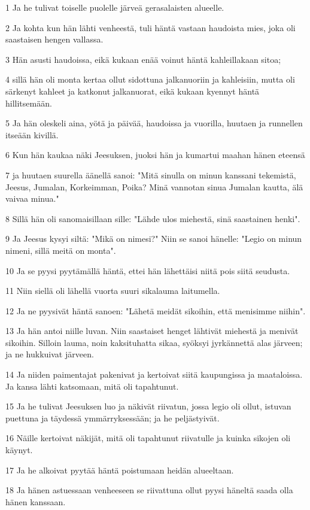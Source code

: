 \par 1 Ja he tulivat toiselle puolelle järveä gerasalaisten alueelle.
\par 2 Ja kohta kun hän lähti venheestä, tuli häntä vastaan haudoista mies, joka oli saastaisen hengen vallassa.
\par 3 Hän asusti haudoissa, eikä kukaan enää voinut häntä kahleillakaan sitoa;
\par 4 sillä hän oli monta kertaa ollut sidottuna jalkanuoriin ja kahleisiin, mutta oli särkenyt kahleet ja katkonut jalkanuorat, eikä kukaan kyennyt häntä hillitsemään.
\par 5 Ja hän oleskeli aina, yötä ja päivää, haudoissa ja vuorilla, huutaen ja runnellen itseään kivillä.
\par 6 Kun hän kaukaa näki Jeesuksen, juoksi hän ja kumartui maahan hänen eteensä
\par 7 ja huutaen suurella äänellä sanoi: "Mitä sinulla on minun kanssani tekemistä, Jeesus, Jumalan, Korkeimman, Poika? Minä vannotan sinua Jumalan kautta, älä vaivaa minua."
\par 8 Sillä hän oli sanomaisillaan sille: "Lähde ulos miehestä, sinä saastainen henki".
\par 9 Ja Jeesus kysyi siltä: "Mikä on nimesi?" Niin se sanoi hänelle: "Legio on minun nimeni, sillä meitä on monta".
\par 10 Ja se pyysi pyytämällä häntä, ettei hän lähettäisi niitä pois siitä seudusta.
\par 11 Niin siellä oli lähellä vuorta suuri sikalauma laitumella.
\par 12 Ja ne pyysivät häntä sanoen: "Lähetä meidät sikoihin, että menisimme niihin".
\par 13 Ja hän antoi niille luvan. Niin saastaiset henget lähtivät miehestä ja menivät sikoihin. Silloin lauma, noin kaksituhatta sikaa, syöksyi jyrkännettä alas järveen; ja ne hukkuivat järveen.
\par 14 Ja niiden paimentajat pakenivat ja kertoivat siitä kaupungissa ja maataloissa. Ja kansa lähti katsomaan, mitä oli tapahtunut.
\par 15 Ja he tulivat Jeesuksen luo ja näkivät riivatun, jossa legio oli ollut, istuvan puettuna ja täydessä ymmärryksessään; ja he peljästyivät.
\par 16 Näille kertoivat näkijät, mitä oli tapahtunut riivatulle ja kuinka sikojen oli käynyt.
\par 17 Ja he alkoivat pyytää häntä poistumaan heidän alueeltaan.
\par 18 Ja hänen astuessaan venheeseen se riivattuna ollut pyysi häneltä saada olla hänen kanssaan.
